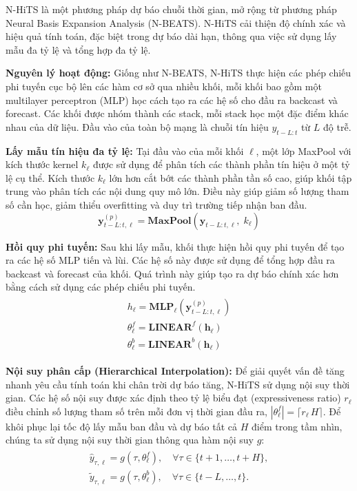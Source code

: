 N-HiTS là một phương pháp dự báo chuỗi thời gian, mở rộng từ phương pháp Neural Basis Expansion Analysis (N-BEATS). N-HiTS cải thiện độ chính xác và hiệu quả tính toán, đặc biệt trong dự báo dài hạn, thông qua việc sử dụng lấy mẫu đa tỷ lệ và tổng hợp đa tỷ lệ.

\textbf{Nguyên lý hoạt động:}
Giống như N-BEATS, N-HiTS thực hiện các phép chiếu phi tuyến cục bộ lên các hàm cơ sở qua nhiều khối, mỗi khối bao gồm một multilayer perceptron (MLP) học cách tạo ra các hệ số cho đầu ra backcast và forecast. Các khối được nhóm thành các stack, mỗi stack học một đặc điểm khác nhau của dữ liệu. Đầu vào của toàn bộ mạng là chuỗi tín hiệu \(y_{t-L:t}\) từ \(L\) độ trễ.

\textbf{Lấy mẫu tín hiệu đa tỷ lệ:}
Tại đầu vào của mỗi khối \(\ell\), một lớp MaxPool với kích thước kernel \(k_{\ell}\) được sử dụng để phân tích các thành phần tín hiệu ở một tỷ lệ cụ thể. Kích thước \(k_{\ell}\) lớn hơn cắt bớt các thành phần tần số cao, giúp khối tập trung vào phân tích các nội dung quy mô lớn. Điều này giúp giảm số lượng tham số cần học, giảm thiểu overfitting và duy trì trường tiếp nhận ban đầu.
\[\mathbf{y}^{(p)}_{t-L:t, \ell} = \mathbf{MaxPool}\left(\mathbf{y}_{t-L:t, \ell},\; k_{\ell}\right)\]

\textbf{Hồi quy phi tuyến:}
Sau khi lấy mẫu, khối thực hiện hồi quy phi tuyến để tạo ra các hệ số MLP tiến và lùi. Các hệ số này được sử dụng để tổng hợp đầu ra backcast và forecast của khối. Quá trình này giúp tạo ra dự báo chính xác hơn bằng cách sử dụng các phép chiếu phi tuyến.
\begin{align*}
\begin{split}
    {h}_{\ell} = \mathbf{MLP}_{\ell}\left(\mathbf{y}^{(p)}_{t-L:t,\ell}\right)\\
    \theta^{f}_{\ell} = \textbf{LINEAR}^{f}\left(\mathbf{h}_{\ell}\right)\\
    \theta^{b}_{\ell} = \textbf{LINEAR}^{b}\left(\mathbf{h}_{\ell}\right)
\end{split}
\end{align*}

\textbf{Nội suy phân cấp (Hierarchical Interpolation):}
Để giải quyết vấn đề tăng nhanh yêu cầu tính toán khi chân trời dự báo tăng, N-HiTS sử dụng nội suy thời gian. Các hệ số nội suy được xác định theo tỷ lệ biểu đạt (expressiveness ratio) \(r_{\ell}\) điều chỉnh số lượng tham số trên mỗi đơn vị thời gian đầu ra, $|\theta^{f}_{\ell}|= \lceil r_{\ell} \, H \rceil$. Để khôi phục lại tốc độ lấy mẫu ban đầu và dự báo tất cả $H$ điểm trong tầm nhìn, chúng ta sử dụng nội suy thời gian thông qua hàm nội suy $g$:
\begin{align*}
\begin{split}
    \hat{y}_{\tau,\ell}   = g(\tau, \theta^{f}_{\ell}), \quad \forall \tau \in \{t+1,\dots,t+H\}, \\
    \tilde{y}_{\tau,\ell} = g(\tau, \theta^{b}_{\ell}), \quad \forall \tau \in \{t-L,\dots,t\}. 
\end{split}
\end{align*}